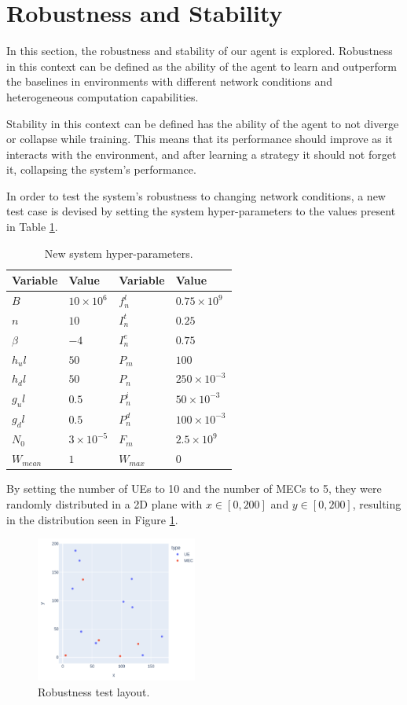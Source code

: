 \section{Robustness and Stability} \label{robustness_stability}

In this section, the robustness and stability of our agent is explored. Robustness in this context can be defined as the ability of the agent to learn and outperform the baselines in environments with different network conditions and heterogeneous computation capabilities. 

Stability in this context can be defined has the ability of the agent to not diverge or collapse while training. This means that its performance should improve as it interacts with the environment, and after learning a strategy it should not forget it, collapsing the system's performance.

In order to test the system's robustness to changing network conditions, a new test case is devised by setting the system hyper-parameters to the values present in Table \ref{new_hyperparams}.

\begin{table}[H]
\centering
\begin{tabular}{|l|l|l|l|}
\hline
Variable             & Value & Variable                & Value \\ \hline
$B$&$10\times10^{6}$&$f_n^l$&$0.75\times10^{9}$\\
$n$&$10$&$I_n^t$&$0.25$\\
$\beta$&$-4$&$I_n^e$&$0.75$\\
$h_ul$&$50$& $P_m$&$100$\\
$h_dl$&$50$& $P_n$& $250\times10^{-3}$\\
$g_ul$&$0.5$&$P_n^i$&$50\times10^{-3}$\\
$g_dl$&$0.5$&$P_n^d$&$100\times10^{-3}$\\
$N_0$&$3\times10^{-5}$&$F_m$&$2.5\times10^{9}$\\
$W_{mean}$&$1$&$W_{max}$&$0$\\ \hline
\end{tabular}
\caption{New system hyper-parameters.}\label{new_hyperparams}
\end{table}

By setting the number of \acrshort{UE}s to 10 and the number of \acrshort{MEC}s to 5, they were randomly distributed in a 2D plane with $x \in [0, 200]$ and $y \in [0, 200]$, resulting in the distribution seen in Figure \ref{robust_test}.

\begin{figure}[H]
  \centering
  \includegraphics[width=200px]{images/5_10_layout.png}
  \caption{Robustness test layout.}  \label{robust_test}
\end{figure}

